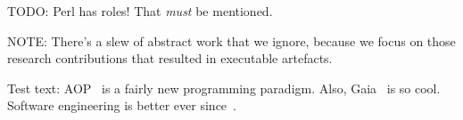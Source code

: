 \documentclass{article}
\begin{document}
TODO: Perl has roles! That \emph{must} be mentioned.

NOTE: There's a slew of abstract work that we ignore, because we focus on those research contributions that resulted in executable artefacts.

Test text:
AOP~\cite{journals/ai/Shoham93} is a fairly new programming paradigm.
Also, Gaia~\cite{journals/aamas/WooldridgeJK00} is so cool.
Software engineering is better ever since~\cite{conf/aose/WooldridgeC00}.



\end{document}
